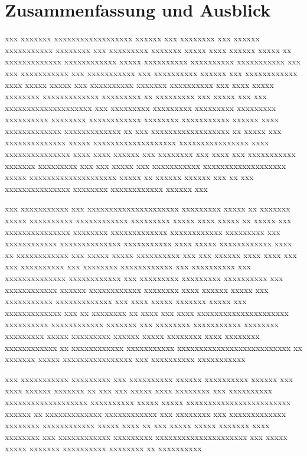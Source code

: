 %
\chapter{Zusammenfassung und Ausblick}\label{chap:xxx}
xxx xxxxxxx xxxxxxxxxxxxxxxxxx xxxxxx xxx xxxxxxxx xxx xxxxxx xxxxxxxxxxx xxxxxxxx xxx xxxxxxxxx xxxxxxx xxxxx xxxx xxxxxx xxxxx xx xxxxxxxxxxxxx xxxxxxxxxxxx xxxxx xxxxxxxxxx xxxxxxxxxx xxxxxxxxxxx xxx xxx xxxxxxxxxxx xxx xxxxxxxxxxx xxx xxxxxxxxxx xxxxxx xxx xxxxxxxxxxxx xxxx xxxxx xxxxx xxx xxxxxxxxxx xxxxxxx xxxxxxxxxx xxx xxxx xxxxx xxxxxxxx xxxxxxxxxxxxx xxxxxxxxx xx xxxxxxxxx xxx xxxxx xxx xxx xxxxxxxxxxxxxxxxxxxx xxx xxxxxxxxx xxxxxxxxx xxxxxxxxx xxxxxxxxx xxxxxxxxxx xxxxxxxx xxxxxxxxxxxx xxxxxxxx xxxxxxxxxxx xxxxxx xxxx xxxxxxxxxxxxx xxxxxxxxxxxxx xx xxx xxxxxxxxxxxxxxxxxx xx xxxxx xxx xxxxxxxxxxxxxx xxxxx xxxxxxxxxxxxxxxxxxx xxxxxxxxxxxxxxxx xxxx xxxxxxxxxxxxxxx xxxx xxxx xxxxxx xxx xxxxxxxx xxx xxxx xxx xxxxxxxxxxx xxxxxxx xxxxxxxxx xxx xxx xxxxx xxx xxxxxxxxxxx xxxxxxxxxxxxxxxxxxx xxxxx xxxxxxxxxxxxxxxxxxxx xxxxx xx xxxxxx xxxxxx xxx xx xxx xxxxxxxxxxxxxxx xxxxxxxx xxxxxxxxxxxx xxxxxx xxx

xxx xxxxxxxxxxx xxx xxxxxxxxxxxxxxxxxxxxx xxxxxxxxx xxxxx xx xxxxxxx xxxxx xxxxxxxxxx xxxxxxxxxxxx xxxxxxxxx xxxxx xxxx xxxxx xx xxxxx xxx xxxxxxxxxxxxxxx xxxxxxxx xxxxxxxxxxxxx xxxxxxxxxxxx xxxxxxxxx xxx xxxxxxxxxxxx xxxxxxxxxxxxxx xxxxxxxxxxx xxxx xxxxx xxxxxxxxxxxx xxxx xx xxxxxxxxxxxx xxx xxxxx xxxxx xxxxxxxxxx xxx xxx xxxxxx xxxx xxxx xxx xxx xxxxxxxxxx xxx xxxxxxxx xxxxxxxxxxxx xxx xxxxxxxxxx xxx xxxxxxxxxxxxxx xxxxxxxxxxxx xxx xxxxxxxxx xxxxxxxxx xxxxxxxxxx xxx xxxxxxxxxxxx xxxxxx xxxxxxxxxxxx xxxxxxxx xxxx xxxxxx xxxxx xxx xxxxxxxxxxx xxxxxxxxxxxxx xxx xxxx xxxxx xxxxxxx xxxxx xxx xxxxxxxxxxxxx xxx xx xxxxxxxx xx xxxx xxx xxxx xxxxxxxxxxxxxxxxxxxxx xxxxxxxxxx xxxxxxxxxxxx xxxxxxx xxx xxxxxxxx xxxxxxxxxxx xxxxxxxx xxxxxxxxx xxxxx xxxxxxxxx xxxxxx xxxxx xxxxxxxx xxxx xxxxxxxx xxxxxxxxxxxx xx xxxxxxxxxxxx xxxxxxxxxxx xxxxxxxxxxxxxxxxxxxxxxxxxx xx xxxxxxx xxxxx xxxxxxxxxxxxxxxx xxx xxxxxxxxxx xxxxxxxxxxx

xxx xxxxxxxxxxx xxxxxxxxx xxx xxxxxxxxxx xxxxxx xxxxxxxxxx xxxxxx xxx xxxx xxxxxx xxxxxxx xx xxx xxx xxxxx xxxx xxxxxxxx xxx xxxxxxxxxx xxxxxxxxxxxxxxxxxxx xxxxxxxxxx xxxxx xxxxx xxxxxxxxxxxxxxxxxxxxxxxx xxxxxx xx xxxxxxxxxxxxx xxxxxxxxxxxx xxx xxxxxxxx xxx xxxxxxxxxxxxx xxxxxxxx xxxxxxxxxxxx xxxxx xxxx xx xxx xxxxx xxxxx xxxxxxx xxxx xxxxxxxx xxx xxxxxxxxxxxx xxxxxxxxx xxxxxxxxxxxxxxxxxxxxx xxx xxxxx xxxxx xxxxxxx xxxxxxxxxx xxxxxxxx xx xxxxxxxxxx

